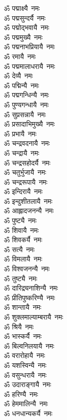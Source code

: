 \begin{multicols}{2}
\begin{flushleft}
ॐ पद्माक्ष्यै~नमः\\
ॐ पद्मसुन्दर्यै~नमः\\
ॐ पद्मोद्भवायै~नमः\\
ॐ पद्ममुख्यै~नमः\\
ॐ पद्मनाभप्रियायै~नमः\\
ॐ रमायै~नमः\\
ॐ पद्ममालाधरायै~नमः\\
ॐ देव्यै~नमः\\
ॐ पद्मिन्यै~नमः\hfill{}\\
ॐ पद्मगन्धिन्यै~नमः\\
ॐ पुण्यगन्धायै~नमः\\
ॐ सुप्रसन्नायै~नमः\\
ॐ प्रसादाभिमुख्यै~नमः\\
ॐ प्रभायै~नमः\\
ॐ चन्द्रवदनायै~नमः\\
ॐ चन्द्रायै~नमः\\
ॐ चन्द्रसहोदर्यै~नमः\\
ॐ चतुर्भुजायै~नमः\\
ॐ चन्द्ररूपायै~नमः\hfill{}\\
ॐ इन्दिरायै~नमः\\
ॐ इन्दुशीतलायै~नमः\\
ॐ आह्लादजनन्यै~नमः\\
ॐ पुष्ट्यै~नमः\\
ॐ शिवायै~नमः\\
ॐ शिवकर्यै~नमः\\
ॐ सत्यै~नमः\\
ॐ विमलायै~नमः\\
ॐ विश्वजनन्यै~नमः\\
ॐ तुष्ट्यै~नमः\hfill{}\\
ॐ दारिद्र्यनाशिन्यै~नमः\\
ॐ प्रीतिपुष्करिण्यै~नमः\\
ॐ शान्तायै~नमः\\
ॐ शुक्लमाल्याम्बरायै~नमः\\
ॐ श्रियै~नमः\\
ॐ भास्कर्यै~नमः\\
ॐ बिल्वनिलयायै~नमः\\
ॐ वरारोहायै~नमः\\
ॐ यशस्विन्यै~नमः\\
ॐ वसुन्धरायै~नमः\hfill{}\\
ॐ उदाराङ्गायै~नमः\\
ॐ हरिण्यै~नमः\\
ॐ हेममालिन्यै~नमः\\
ॐ धनधान्यकर्यै~नमः\\

\end{flushleft}
\end{multicols}
